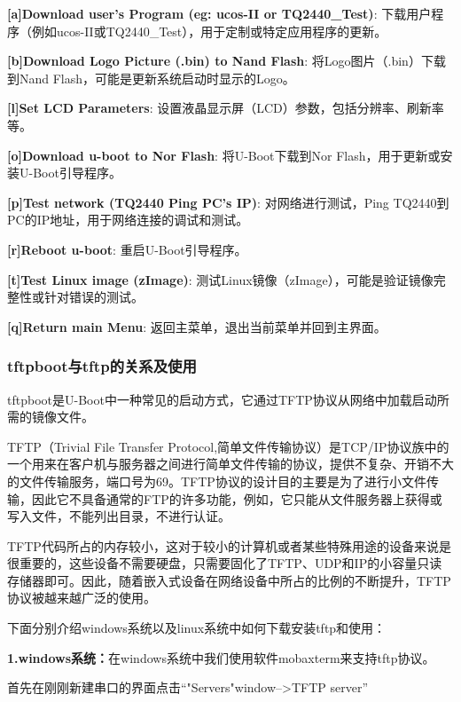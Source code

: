     \textbf{[a]Download user's Program (eg: ucos-II or TQ2440_Test)}: 下载用户程序（例如ucos-II或TQ2440_Test），用于定制或特定应用程序的更新。
    
   \textbf{[b]Download Logo Picture (.bin) to Nand Flash}: 将Logo图片（.bin）下载到Nand Flash，可能是更新系统启动时显示的Logo。
    
    \textbf{[l]Set LCD Parameters}: 设置液晶显示屏（LCD）参数，包括分辨率、刷新率等。
    
    \textbf{[o]Download u-boot to Nor Flash}: 将U-Boot下载到Nor Flash，用于更新或安装U-Boot引导程序。
    
    \textbf{[p]Test network (TQ2440 Ping PC's IP)}: 对网络进行测试，Ping TQ2440到PC的IP地址，用于网络连接的调试和测试。
    
    \textbf{[r]Reboot u-boot}: 重启U-Boot引导程序。
    
    \textbf{[t]Test Linux image (zImage)}: 测试Linux镜像（zImage），可能是验证镜像完整性或针对错误的测试。
    
    \textbf{[q]Return main Menu}: 返回主菜单，退出当前菜单并回到主界面。
    
\subsubsection{tftpboot与tftp的关系及使用}

    tftpboot是U-Boot中一种常见的启动方式，它通过TFTP协议从网络中加载启动所需的镜像文件。
    
    TFTP（Trivial File Transfer Protocol,简单文件传输协议）是TCP/IP协议族中的一个用来在客户机与服务器之间进行简单文件传输的协议，提供不复杂、开销不大的文件传输服务，端口号为69。TFTP协议的设计目的主要是为了进行小文件传输，因此它不具备通常的FTP的许多功能，例如，它只能从文件服务器上获得或写入文件，不能列出目录，不进行认证。
    
    TFTP代码所占的内存较小，这对于较小的计算机或者某些特殊用途的设备来说是很重要的，这些设备不需要硬盘，只需要固化了TFTP、UDP和IP的小容量只读存储器即可。因此，随着嵌入式设备在网络设备中所占的比例的不断提升，TFTP协议被越来越广泛的使用。
    
    下面分别介绍windows系统以及linux系统中如何下载安装tftp和使用：
    
    \newpage
    
    \textbf{1.windows系统：}在windows系统中我们使用软件mobaxterm来支持tftp协议。
    
    首先在刚刚新建串口的界面点击“"Servers"window-->TFTP server”
    
